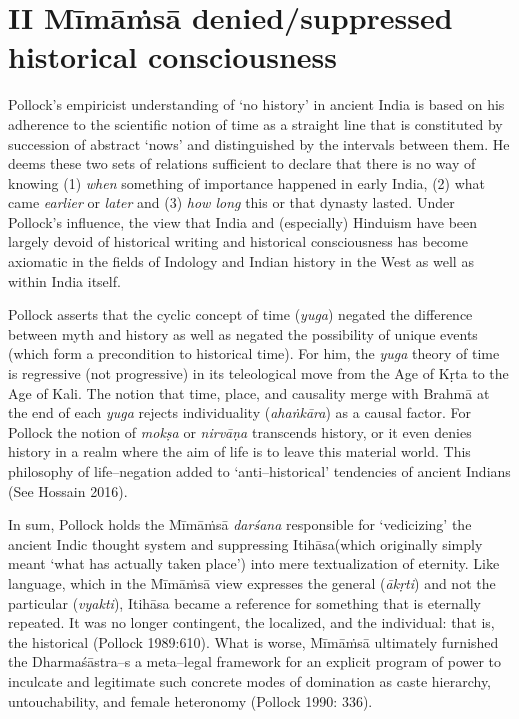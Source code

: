 \section*{II Mīmāṁsā denied/suppressed historical consciousness}

Pollock’s empiricist understanding of ‘no history’ in ancient India is based on his adherence to the scientific notion of time as a straight line that is constituted by succession of abstract ‘nows’ and distinguished by the intervals between them. He deems these two sets of relations sufficient to declare that there is no way of knowing (1) \textit{when} something of importance happened in early India, (2) what came \textit{earlier }or \textit{later} and (3) \textit{how long} this or that dynasty lasted. Under Pollock’s influence, the view that India and (especially) Hinduism have been largely devoid of historical writing and historical consciousness has become axiomatic in the fields of Indology and Indian history in the West as well as within India itself.

Pollock asserts that the cyclic concept of time (\textit{yuga}) negated the difference between myth and history as well as negated the possibility of unique events (which form a precondition to historical time). For him, the \textit{yuga} theory of time is regressive (not progressive) in its teleological move from the Age of Kṛta to the Age of Kali. The notion that time, place, and causality merge with Brahmā at the end of each \textit{yuga} rejects individuality (\textit{ahaṅkāra}) as a causal factor. For Pollock the notion of \textit{mokṣa} or \textit{nirvāṇa} transcends history, or it even denies history in a realm where the aim of life is to leave this material world. This philosophy of life–negation added to ‘anti–historical’ tendencies of ancient Indians (See Hossain 2016).

In sum, Pollock holds the Mīmāṁsā \textit{darśana} responsible for ‘vedicizing’ the ancient Indic thought system and suppressing Itihāsa(which originally simply meant ‘what has actually taken place’) into mere textualization of eternity. Like language, which in the Mīmāṁsā view expresses the general (\textit{ākṛti}) and not the particular (\textit{vyakti}), Itihāsa became a reference for something that is eternally repeated. It was no longer contingent, the localized, and the individual: that is, the historical (Pollock 1989:610). What is worse, Mīmāṁsā ultimately furnished the Dharmaśāstra–s a meta–legal framework for an explicit program of power to inculcate and legitimate such concrete modes of domination as caste hierarchy, untouchability, and female heteronomy (Pollock 1990: 336).


